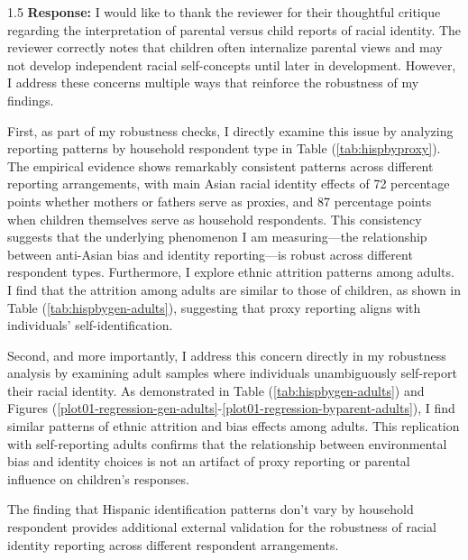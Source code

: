 \documentclass[12pt,english]{article}
\newcommand{\rrxspc}{1.5}
\begin{document}
\begin{refsection}
        \begin{spacing}{\rrxspc}
           \textbf{Response:} I would like to thank the reviewer for their thoughtful critique regarding the interpretation of parental versus child reports of racial identity. The reviewer correctly notes that children often internalize parental views and may not develop independent racial self-concepts until later in development. However, I address these concerns multiple ways that reinforce the robustness of my findings.
           
           First, as part of my robustness checks, I directly examine this issue by analyzing reporting patterns by household respondent type in Table (\ref{tab:hispbyproxy}). The empirical evidence shows remarkably consistent patterns across different reporting arrangements, with main Asian racial identity effects of 72 percentage points whether mothers or fathers serve as proxies, and 87 percentage points when children themselves serve as household respondents. This consistency suggests that the underlying phenomenon I am measuring—the relationship between anti-Asian bias and identity reporting—is robust across different respondent types. Furthermore, I explore ethnic attrition patterns among adults. I find that the attrition among adults are similar to those of children, as shown in Table (\ref{tab:hispbygen-adults}), suggesting that proxy reporting aligns with individuals' self-identification. 
           
           Second, and more importantly, I address this concern directly in my robustness analysis by examining adult samples where individuals unambiguously self-report their racial identity. As demonstrated in Table (\ref{tab:hispbygen-adults}) and Figures (\ref{plot01-regression-gen-adults}-\ref{plot01-regression-byparent-adults}), I find similar patterns of ethnic attrition and bias effects among adults. This replication with self-reporting adults confirms that the relationship between environmental bias and identity choices is not an artifact of proxy reporting or parental influence on children's responses.
                      
           The \textcite{antmanEthnicAttritionAssimilation2020} finding that Hispanic identification patterns don't vary by household respondent provides additional external validation for the robustness of racial identity reporting across different respondent arrangements.
           

\end{spacing}
\end{refsection}
\end{document}
